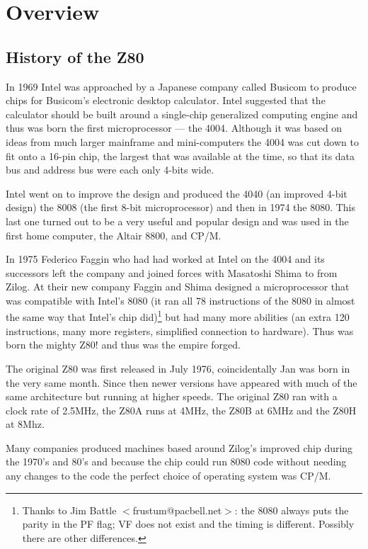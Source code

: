 \documentclass[oneside,a4paper]{book}
\begin{document}
\chapter{Overview}

\section{History of the Z80}

In 1969 Intel was approached by a Japanese company called Busicom to produce 
chips for Busicom's electronic desktop calculator. Intel suggested that the 
calculator should be built around a single-chip generalized computing engine 
and thus was born the first microprocessor --- the 4004. Although it was based 
on ideas from much larger mainframe and mini-computers the 4004 was cut down 
to fit onto a 16-pin chip, the largest that was available at the time, so that 
its data bus and address bus were each only 4-bits wide. 

Intel went on to improve the design and produced the 4040 (an improved 4-bit 
design) the 8008 (the first 8-bit microprocessor) and then in 1974 the 8080. 
This last one turned out to be a very useful and popular design and was used 
in the first home computer, the Altair 8800, and CP/M. 

In 1975 Federico Faggin who had had worked at Intel on the 4004 and its 
successors left the company and joined forces with Masatoshi Shima to from 
Zilog. At their new company Faggin and Shima designed a microprocessor that 
was compatible with Intel's 8080 (it ran all 78 instructions of the 8080 in 
almost the same way that Intel's chip did)\footnote{Thanks to Jim Battle 
$<$frustum@pacbell.net$>$: the 8080 always puts the parity in the PF flag;
VF does not exist and the timing is different. Possibly there are other
differences.} but had many more abilities (an extra 120 instructions, many 
more registers, simplified connection to hardware). Thus was born the 
mighty Z80! and thus was the empire forged.

The original Z80 was first released in July 1976, coincidentally Jan was born 
in the very same month. Since then newer versions have appeared with much of 
the same architecture but running at higher speeds. 
The original Z80 ran with a clock rate of 2.5MHz, the Z80A runs at 4MHz, the 
Z80B at 6MHz and the Z80H at 8Mhz. 

Many companies produced machines based around Zilog's improved chip during the 
1970's and 80's and because the chip could run 8080 code without needing any 
changes to the code the perfect choice of operating system was CP/M. 
\end{document}

